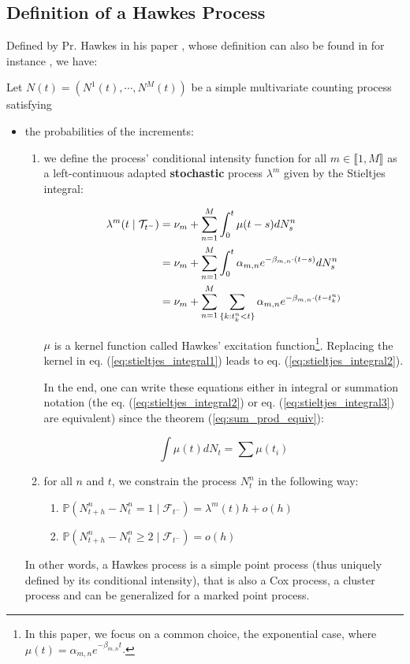 \documentclass[11pt]{book}
\begin{document}
\subsection{Definition of a Hawkes Process}
Defined by Pr. Hawkes in his paper \cite{Hawkes}, whose definition can also be found in for instance \cite{Chen}, we have:
\begin{definition}
Let $N(t) = \left ( N^1(t), \cdots , N^M(t) \right )$ be a simple multivariate counting process satisfying 

\begin{itemize}
\setlength{\itemindent}{2 cm}
\item the probabilities of the increments:
\begin{enumerate}
\setlength{\itemindent}{3 cm}
\item we define the process' conditional intensity function for all $m \in \llbracket 1, M \rrbracket$ as a left-continuous adapted \textbf{stochastic} process  $\lambda^m$ given by the Stieltjes integral:

\begin{align}
\lambda^m (t \mid \mathcal{T}_{t^-} ) &= 
\nu_m + \sum_{n = 1}^M \int_0^t \mu( t - s ) d N^n_s  \label{eq:stieltjes_integral1} \\
&= \nu_m + \sum_{n = 1}^M \int_0^t \alpha_{m,n} e^{- \beta_{m,n} \cdot ( t - s ) } d N^n_s  \label{eq:stieltjes_integral2} \\
&= \nu_m + \sum_{n = 1}^M \sum_{ \{k: t_k^n < t \}} \alpha_{m,n} e^{- \beta_{m,n} \cdot ( t - t_k^n ) } \label{eq:stieltjes_integral3}
\end{align}

$ \mu $ is a kernel function called Hawkes' excitation function\footnote{In this paper, we focus on a common choice, the exponential case, where $\mu(t) = \alpha_{m,n} e^{- \beta_{m,n}  t  }$.}. Replacing the kernel in eq. (\ref{eq:stieltjes_integral1}) leads to eq. (\ref{eq:stieltjes_integral2}).


In the end, one can write these equations either in integral or summation notation (the eq. (\ref{eq:stieltjes_integral2}) or eq. (\ref{eq:stieltjes_integral3}) are equivalent) since the theorem (\ref{eq:sum_prod_equiv}):

$$ \int \mu(t) dN_t = \sum \mu(t_i) $$
 

\item  for all $n$ and $t$, we constrain the process $N^n_t$ in the following way:

\begin{enumerate}
\setlength{\itemindent}{4 cm}
\item $\mathbb P( N^n_{t+h} - N^n_{t} = 1 \mid \mathcal F_{t^-} ) = \lambda^m (t) h + o(h)$
\item $\mathbb P( N^n_{t+h} - N^n_{t} \geq 2 \mid \mathcal F_{t^-} ) =  o(h)$
\end{enumerate}
\end{enumerate}
In other words, a Hawkes process is a simple point process (thus uniquely defined by its conditional intensity), that is also a Cox process, a cluster process and can be generalized for a marked point process. 



\end{itemize}
\end{definition}
\end{document}

